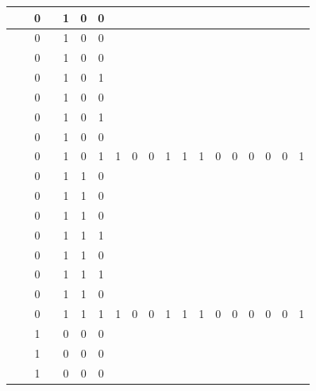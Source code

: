 \begin{table}[!tb]
\begin{tabular}{|c|c|c|c|c|c|c|c|c|c|c|c|c|c|c|c|c|c|c|}
        \rowcolor{red!40}  &  & 0 &  & 1 & 0 & 0 &  &  &  &  &  &  &  &  &  &  &  &  \\ \hline
        \rowcolor{red!40}  &  & 0 &  & 1 & 0 & 0 &  &  &  &  &  &  &  &  &  &  &  &  \\ \hline
        \rowcolor{red!40}  &  & 0 &  & 1 & 0 & 0 &  &  &  &  &  &  &  &  &  &  &  &  \\ \hline
        \rowcolor{red!40}  &  & 0 &  & 1 & 0 & 1 &  &  &  &  &  &  &  &  &  &  &  &  \\ \hline
        \rowcolor{red!40}  &  & 0 &  & 1 & 0 & 0 &  &  &  &  &  &  &  &  &  &  &  &  \\ \hline
        \rowcolor{red!40}  &  & 0 &  & 1 & 0 & 1 &  &  &  &  &  &  &  &  &  &  &  &  \\ \hline
        \rowcolor{red!40}  &  & 0 &  & 1 & 0 & 0 &  &  &  &  &  &  &  &  &  &  &  &  \\ \hline
        \rowcolor{red!40}  &  & 0 &  & 1 & 0 & 1 & 1 & 0 & 0 & 1 & 1 & 1 & 0 & 0 & 0 & 0 & 0 & 1 \\ \hline
        \rowcolor{green!40}  &  & 0 &  & 1 & 1 & 0 &  &  &  &  &  &  &  &  &  &  &  &  \\ \hline
        \rowcolor{green!40}  &  & 0 &  & 1 & 1 & 0 &  &  &  &  &  &  &  &  &  &  &  &  \\ \hline
        \rowcolor{green!40}  &  & 0 &  & 1 & 1 & 0 &  &  &  &  &  &  &  &  &  &  &  &  \\ \hline
        \rowcolor{green!40}  &  & 0 &  & 1 & 1 & 1 &  &  &  &  &  &  &  &  &  &  &  &  \\ \hline
        \rowcolor{green!40}  &  & 0 &  & 1 & 1 & 0 &  &  &  &  &  &  &  &  &  &  &  &  \\ \hline
        \rowcolor{green!40}  &  & 0 &  & 1 & 1 & 1 &  &  &  &  &  &  &  &  &  &  &  &  \\ \hline
        \rowcolor{green!40}  &  & 0 &  & 1 & 1 & 0 &  &  &  &  &  &  &  &  &  &  &  &  \\ \hline
        \rowcolor{green!40}  &  & 0 &  & 1 & 1 & 1 & 1 & 0 & 0 & 1 & 1 & 1 & 0 & 0 & 0 & 0 & 0 & 1 \\ \hline
        \rowcolor{yellow!40}  &  & 1 &  & 0 & 0 & 0 &  &  &  &  &  &  &  &  &  &  &  &  \\ \hline
        \rowcolor{yellow!40}  &  & 1 &  & 0 & 0 & 0 &  &  &  &  &  &  &  &  &  &  &  &  \\ \hline
        \rowcolor{yellow!40}  &  & 1 &  & 0 & 0 & 0 &  &  &  &  &  &  &  &  &  &  &  &  \\ \hline

\end{tabular}
\end{table}
